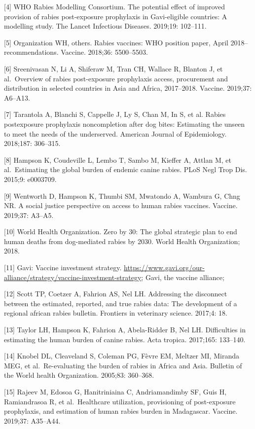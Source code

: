 \documentclass[
  oneside]{book}
\begin{document}
{[}4{]} WHO Rabies Modelling Consortium. The potential effect of improved
provision of rabies post-exposure prophylaxis in Gavi-eligible
countries: A modelling study. The Lancet Infectious Diseases. 2019;19:
102--111.

{[}5{]} Organization WH, others. Rabies vaccines: WHO position paper, April
2018--recommendations. Vaccine. 2018;36: 5500--5503.

{[}6{]} Sreenivasan N, Li A, Shiferaw M, Tran CH, Wallace R, Blanton J, et
al.~Overview of rabies post-exposure prophylaxis access, procurement and
distribution in selected countries in Asia and Africa, 2017--2018.
Vaccine. 2019;37: A6--A13.

{[}7{]} Tarantola A, Blanchi S, Cappelle J, Ly S, Chan M, In S, et al.
Rabies postexposure prophylaxis noncompletion after dog bites:
Estimating the unseen to meet the needs of the underserved. American
Journal of Epidemiology. 2018;187: 306--315.

{[}8{]} Hampson K, Coudeville L, Lembo T, Sambo M, Kieffer A, Attlan M, et
al.~Estimating the global burden of endemic canine rabies. PLoS Negl
Trop Dis. 2015;9: e0003709.

{[}9{]} Wentworth D, Hampson K, Thumbi SM, Mwatondo A, Wambura G, Chng NR. A
social justice perspective on access to human rabies vaccines. Vaccine.
2019;37: A3--A5.

{[}10{]} World Health Organization. Zero by 30: The global strategic plan to
end human deaths from dog-mediated rabies by 2030. World Health
Organization; 2018.

{[}11{]} Gavi: Vaccine investment strategy.
\url{https://www.gavi.org/our-alliance/strategy/vaccine-investment-strategy};
Gavi, the vaccine alliance;

{[}12{]} Scott TP, Coetzer A, Fahrion AS, Nel LH. Addressing the disconnect
between the estimated, reported, and true rabies data: The development
of a regional african rabies bulletin. Frontiers in veterinary science.
2017;4: 18.

{[}13{]} Taylor LH, Hampson K, Fahrion A, Abela-Ridder B, Nel LH.
Difficulties in estimating the human burden of canine rabies. Acta
tropica. 2017;165: 133--140.

{[}14{]} Knobel DL, Cleaveland S, Coleman PG, Fèvre EM, Meltzer MI, Miranda
MEG, et al.~Re-evaluating the burden of rabies in Africa and Asia.
Bulletin of the World health Organization. 2005;83: 360--368.

{[}15{]} Rajeev M, Edosoa G, Hanitriniaina C, Andriamandimby SF, Guis H,
Ramiandrasoa R, et al.~Healthcare utilization, provisioning of
post-exposure prophylaxis, and estimation of human rabies burden in
Madagascar. Vaccine. 2019;37: A35--A44.
\end{document}
